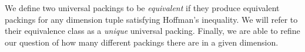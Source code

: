 \noindent We define two universal packings to be \textit{equivalent} if they produce equivalent packings for any dimension tuple satisfying Hoffman's inequality. We will refer to their equivalence class as a \textit{unique} universal packing. Finally, we are able to refine our question of how many different packings there are in a given dimension.

